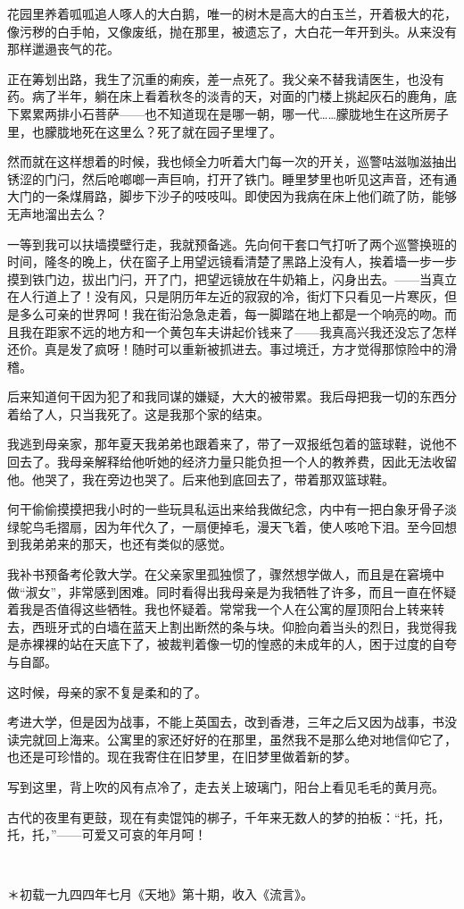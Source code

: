 \par 花园里养着呱呱追人啄人的大白鹅，唯一的树木是高大的白玉兰，开着极大的花，像污秽的白手帕，又像废纸，抛在那里，被遗忘了，大白花一年开到头。从来没有那样邋遢丧气的花。
\par 正在筹划出路，我生了沉重的痢疾，差一点死了。我父亲不替我请医生，也没有药。病了半年，躺在床上看着秋冬的淡青的天，对面的门楼上挑起灰石的鹿角，底下累累两排小石菩萨——也不知道现在是哪一朝，哪一代……朦胧地生在这所房子里，也朦胧地死在这里么？死了就在园子里埋了。
\par 然而就在这样想着的时候，我也倾全力听着大门每一次的开关，巡警咕滋咖滋抽出锈涩的门闩，然后呛啷啷一声巨响，打开了铁门。睡里梦里也听见这声音，还有通大门的一条煤屑路，脚步下沙子的吱吱叫。即使因为我病在床上他们疏了防，能够无声地溜出去么？
\par 一等到我可以扶墙摸壁行走，我就预备逃。先向何干套口气打听了两个巡警换班的时间，隆冬的晚上，伏在窗子上用望远镜看清楚了黑路上没有人，挨着墙一步一步摸到铁门边，拔出门闩，开了门，把望远镜放在牛奶箱上，闪身出去。——当真立在人行道上了！没有风，只是阴历年左近的寂寂的冷，街灯下只看见一片寒灰，但是多么可亲的世界呵！我在街沿急急走着，每一脚踏在地上都是一个响亮的吻。而且我在距家不远的地方和一个黄包车夫讲起价钱来了——我真高兴我还没忘了怎样还价。真是发了疯呀！随时可以重新被抓进去。事过境迁，方才觉得那惊险中的滑稽。
\par 后来知道何干因为犯了和我同谋的嫌疑，大大的被带累。我后母把我一切的东西分着给了人，只当我死了。这是我那个家的结束。
\par 我逃到母亲家，那年夏天我弟弟也跟着来了，带了一双报纸包着的篮球鞋，说他不回去了。我母亲解释给他听她的经济力量只能负担一个人的教养费，因此无法收留他。他哭了，我在旁边也哭了。后来他到底回去了，带着那双篮球鞋。
\par 何干偷偷摸摸把我小时的一些玩具私运出来给我做纪念，内中有一把白象牙骨子淡绿鸵鸟毛摺扇，因为年代久了，一扇便掉毛，漫天飞着，使人咳呛下泪。至今回想到我弟弟来的那天，也还有类似的感觉。
\par 我补书预备考伦敦大学。在父亲家里孤独惯了，骤然想学做人，而且是在窘境中做“淑女”，非常感到困难。同时看得出我母亲是为我牺牲了许多，而且一直在怀疑着我是否值得这些牺牲。我也怀疑着。常常我一个人在公寓的屋顶阳台上转来转去，西班牙式的白墙在蓝天上割出断然的条与块。仰脸向着当头的烈日，我觉得我是赤裸裸的站在天底下了，被裁判着像一切的惶惑的未成年的人，困于过度的自夸与自鄙。
\par 这时候，母亲的家不复是柔和的了。
\par 考进大学，但是因为战事，不能上英国去，改到香港，三年之后又因为战事，书没读完就回上海来。公寓里的家还好好的在那里，虽然我不是那么绝对地信仰它了，也还是可珍惜的。现在我寄住在旧梦里，在旧梦里做着新的梦。
\par 写到这里，背上吹的风有点冷了，走去关上玻璃门，阳台上看见毛毛的黄月亮。
\par 古代的夜里有更鼓，现在有卖馄饨的梆子，千年来无数人的梦的拍板：“托，托，托，托，”——可爱又可哀的年月呵！
\par  
\par ＊初载一九四四年七月《天地》第十期，收入《流言》。

